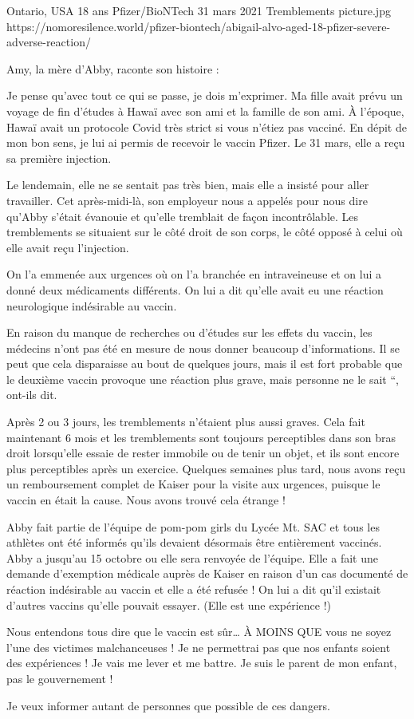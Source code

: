 {Ontario, USA}
{18 ans}
{Pfizer/BioNTech}
{31 mars 2021}
{Tremblements}
{picture.jpg}
{https://nomoresilence.world/pfizer-biontech/abigail-alvo-aged-18-pfizer-severe-adverse-reaction/}
{

Amy, la mère d'Abby, raconte son histoire :

Je pense qu'avec tout ce qui se passe, je dois m'exprimer. Ma fille avait prévu
un voyage de fin d'études à Hawaï avec son ami et la famille de son ami. À
l'époque, Hawaï avait un protocole Covid très strict si vous n'étiez pas
vacciné. En dépit de mon bon sens, je lui ai permis de recevoir le vaccin
Pfizer. Le 31 mars, elle a reçu sa première injection.

Le lendemain, elle ne se sentait pas très bien, mais elle a insisté pour aller
travailler. Cet après-midi-là, son employeur nous a appelés pour nous dire
qu'Abby s'était évanouie et qu'elle tremblait de façon incontrôlable. Les
tremblements se situaient sur le côté droit de son corps, le côté opposé à celui
où elle avait reçu l'injection.

On l'a emmenée aux urgences où on l'a branchée en intraveineuse et on lui a
donné deux médicaments différents. On lui a dit qu'elle avait eu une réaction
neurologique indésirable au vaccin.

En raison du manque de recherches ou d'études sur les effets du vaccin, les
médecins n'ont pas été en mesure de nous donner beaucoup d'informations. Il se
peut que cela disparaisse au bout de quelques jours, mais il est fort probable
que le deuxième vaccin provoque une réaction plus grave, mais personne ne le
sait “, ont-ils dit.

Après 2 ou 3 jours, les tremblements n'étaient plus aussi graves. Cela fait
maintenant 6 mois et les tremblements sont toujours perceptibles dans son bras
droit lorsqu'elle essaie de rester immobile ou de tenir un objet, et ils sont
encore plus perceptibles après un exercice. Quelques semaines plus tard, nous
avons reçu un remboursement complet de Kaiser pour la visite aux urgences,
puisque le vaccin en était la cause. Nous avons trouvé cela étrange !

Abby fait partie de l'équipe de pom-pom girls du Lycée Mt. SAC et tous les
athlètes ont été informés qu'ils devaient désormais être entièrement
vaccinés. Abby a jusqu'au 15 octobre ou elle sera renvoyée de l'équipe. Elle a
fait une demande d'exemption médicale auprès de Kaiser en raison d'un cas
documenté de réaction indésirable au vaccin et elle a été refusée ! On lui a dit
qu'il existait d'autres vaccins qu'elle pouvait essayer. (Elle est une
expérience !)

Nous entendons tous dire que le vaccin est sûr… À MOINS QUE vous ne soyez l'une
des victimes malchanceuses ! Je ne permettrai pas que nos enfants soient des
expériences ! Je vais me lever et me battre. Je suis le parent de mon enfant,
pas le gouvernement !

Je veux informer autant de personnes que possible de ces dangers.

}

